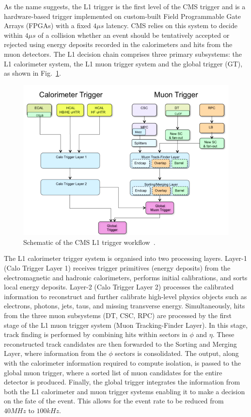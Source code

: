 As the name suggests, the L1 trigger is the first level of the CMS trigger and is a hardware-based trigger implemented on custom-built Field Programmable Gate Arrays (FPGAs) with a fixed $4\unit{\mu s}$ latency. CMS relies on this system to decide within $4\unit{\mu s}$ of a collision whether an event should be tentatively accepted or rejected using energy deposits recorded in the calorimeters and hits from the muon detectors. The L1 decision chain comprises three primary subsystems: the L1 calorimeter system, the L1 muon trigger system and the global trigger (GT), as shown in Fig.~\ref{Figure:Chapter3_CMS_L1_Trigger}.

\begin{figure}[h]
\centering
\includegraphics[width= 1.0\textwidth]{Figures/Chapter3/CMS_L1_Trigger.png}
\caption{Schematic of the CMS L1 trigger workflow~\cite{CMS_L1_Trigger}.}
\label{Figure:Chapter3_CMS_L1_Trigger}
\end{figure}

The L1 calorimeter trigger system is organised into two processing layers. Layer-1 (Calo Trigger Layer 1) receives trigger primitives (energy deposits) from the electromagnetic and hadronic calorimeters, performs initial calibrations, and sorts local energy deposits. Layer-2 (Calo Trigger Layer 2) processes the calibrated information to reconstruct and further calibrate high-level physics objects such as electrons, photons, jets, taus, and missing transverse energy. Simultaneously, hits from the three muon subsystems (DT, CSC, RPC) are processed by the first stage of the L1 muon trigger system (Muon Tracking-Finder Layer). In this stage, track finding is performed by combining hits within sectors in $\phi$ and $\eta$. These reconstructed track candidates are then forwarded to the Sorting and Merging Layer, where information from the $\phi$ sectors is consolidated. The output, along with the calorimeter information required to compute isolation, is passed to the global muon trigger, where a sorted list of muon candidates for the entire detector is produced. Finally, the global trigger integrates the information from both the L1 calorimeter and muon trigger systems enabling it to make a decision on the fate of the event. This allows for the event rate to be reduced from $40\unit{MHz}$ to $100\unit{kHz}$.

